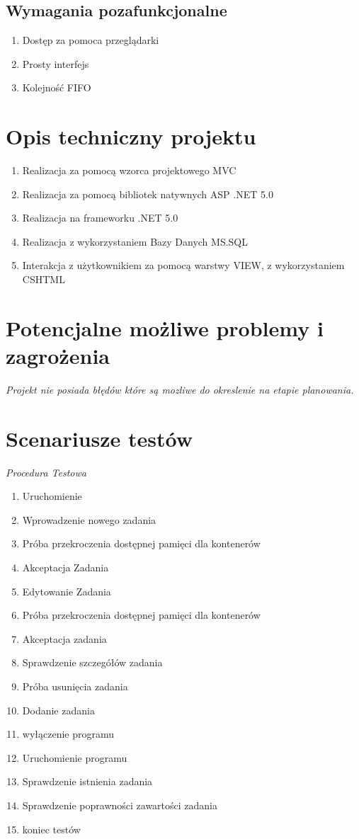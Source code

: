 \documentclass{article}
\begin{document}
\subsection{Wymagania pozafunkcjonalne}
\begin{enumerate}
    \item Dostęp za pomoca przeglądarki
    \item Prosty interfejs
    \item Kolejność FIFO
\end{enumerate}
\section{Opis techniczny projektu}
{\small\it 
\begin{enumerate}
    \item Realizacja za pomocą wzorca projektowego MVC
    \item Realizacja za pomocą bibliotek natywnych ASP .NET 5.0
    \item Realizacja na frameworku .NET 5.0
    \item Realizacja z wykorzystaniem Bazy Danych MS.SQL
    \item Interakcja z użytkownikiem za pomocą warstwy VIEW, z wykorzystaniem CSHTML
\end{enumerate}
\section{Potencjalne możliwe problemy i zagrożenia}
{\small\it Projekt nie posiada błędów które są mozliwe do okreslenie na etapie planowania.}
\section{Scenariusze testów}
{\small\it Procedura Testowa}
\begin{enumerate}
    \item Uruchomienie
    \item Wprowadzenie nowego zadania
    \item Próba przekroczenia dostępnej pamięci dla kontenerów
    \item Akceptacja Zadania
    \item Edytowanie Zadania
     \item   Próba przekroczenia dostępnej pamięci dla kontenerów
     \item Akceptacja zadania
     \item Sprawdzenie szczegółów zadania
     \item Próba usunięcia zadania
     \item Dodanie zadania
     \item wyłączenie programu
     \item Uruchomienie programu
     \item Sprawdzenie istnienia zadania
     \item Sprawdzenie poprawności zawartości zadania
     \item koniec testów
\end{enumerate}
\pagebreak
}
\end{document}
